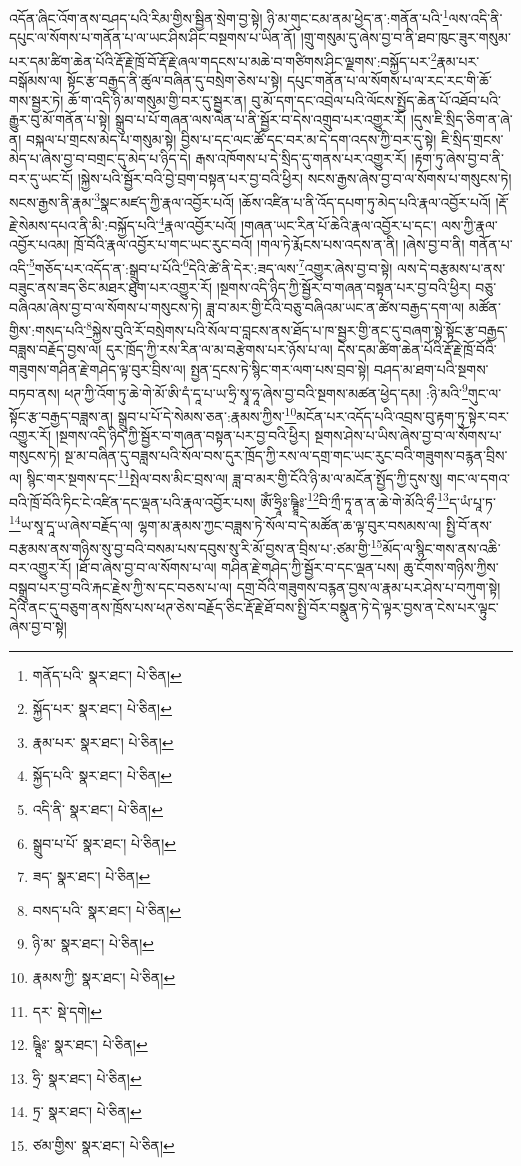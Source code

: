 འདོན་ཞིང་འོག་ནས་བཤད་པའི་རིམ་གྱིས་སྦྱིན་སྲེག་བྱ་སྟེ། ཉི་མ་གུང་ངམ་ནམ་ཕྱེད་ན་:གནོན་པའི་\footnote{གནོད་པའི་  སྣར་ཐང་།  པེ་ཅིན། }ལས་འདི་ནི་དཔུང་ལ་སོགས་པ་གནོན་པ་ལ་ཡང་ཤིས་ཤིང་བསྔགས་པ་ཡིན་ནོ། །གྲུ་གསུམ་དུ་ཞེས་བྱ་བ་ནི་ཐབ་ཁུང་ཟུར་གསུམ་པར་དམ་ཚིག་ཆེན་པོའི་རྡོ་རྗེ་ཁྲོ་བོ་རྡོ་རྗེ་ཞལ་གདངས་པ་མཆེ་བ་གཙིགས་ཤིང་ལྗགས་:བསྐྱོད་པར་\footnote{སྐྱོད་པར་  སྣར་ཐང་།  པེ་ཅིན། }རྣམ་པར་བསྒོམས་ལ། སྟོང་རྩ་བརྒྱད་ནི་ཚུལ་བཞིན་དུ་བསྲེག་ཅེས་པ་སྟེ། དཔུང་གནོན་པ་ལ་སོགས་པ་ལ་རང་རང་གི་ཆོ་གས་སྦྱར་ཏེ། ཆོ་ག་འདི་ཉི་མ་གསུམ་གྱི་བར་དུ་སྦྱར་ན། བུ་མོ་དག་དང་འབྲེལ་པའི་ལོངས་སྤྱོད་ཆེན་པོ་འཐོབ་པའི་རྒྱུར་བུ་མོ་གནོན་པ་སྟེ། སྒྲུབ་པ་པོ་གཞན་ལས་ལེན་པ་ནི་སྦྱོར་བ་དེས་འགྲུབ་པར་འགྱུར་རོ། །དུས་ཇི་སྲིད་ཅིག་ན་ཞེ་ན། བསྐལ་པ་གྲངས་མེད་པ་གསུམ་སྟེ། བྱིས་པ་དང་ལང་ཚོ་དང་བར་མ་དེ་དག་འདས་ཀྱི་བར་དུ་སྟེ། ཇི་སྲིད་གྲངས་མེད་པ་ཞེས་བྱ་བ་བགྲང་དུ་མེད་པ་ཉིད་དེ། རྒས་འཁོགས་པ་དེ་སྲིད་དུ་གནས་པར་འགྱུར་རོ། །རྟག་ཏུ་ཞེས་བྱ་བ་ནི་བར་དུ་ཡང་ངོ། །སྐྱེས་པའི་སྦྱོར་བའི་བྱེ་བྲག་བསྟན་པར་བྱ་བའི་ཕྱིར། སངས་རྒྱས་ཞེས་བྱ་བ་ལ་སོགས་པ་གསུངས་ཏེ། སངས་རྒྱས་ནི་རྣམ་\footnote{རྣམ་པར་  སྣར་ཐང་།  པེ་ཅིན། }སྣང་མཛད་ཀྱི་རྣལ་འབྱོར་པའོ། །ཆོས་འཛིན་པ་ནི་འོད་དཔག་ཏུ་མེད་པའི་རྣལ་འབྱོར་པའོ། །རྡོ་རྗེ་སེམས་དཔའ་ནི་མི་:བསྐྱོད་པའི་\footnote{སྐྱོད་པའི་  སྣར་ཐང་།  པེ་ཅིན། }རྣལ་འབྱོར་པའོ། །གཞན་ཡང་རིན་པོ་ཆེའི་རྣལ་འབྱོར་པ་དང་། ལས་ཀྱི་རྣལ་འབྱོར་པའམ། ཁྲོ་བོའི་རྣལ་འབྱོར་པ་གང་ཡང་རུང་བའོ། །གལ་ཏེ་རྨོངས་པས་འདས་ན་ནི། །ཞེས་བྱ་བ་ནི། གནོན་པ་འདི་\footnote{འདི་ནི་  སྣར་ཐང་།  པེ་ཅིན། }གཅོད་པར་འདོད་ན་:སྒྲུབ་པ་པོའི་\footnote{སྒྲུབ་པ་པོ་  སྣར་ཐང་།  པེ་ཅིན། }དེའི་ཚེ་ནི་དེར་:ཟད་ལས་\footnote{ཟད་  སྣར་ཐང་།  པེ་ཅིན། }འགྱུར་ཞེས་བྱ་བ་སྟེ། ལས་དེ་བརྩམས་པ་ནས་བཟུང་ནས་ཟད་ཅིང་མཐར་ཐུག་པར་འགྱུར་རོ། །སྔགས་འདི་ཉིད་ཀྱི་སྦྱོར་བ་གཞན་བསྟན་པར་བྱ་བའི་ཕྱིར། བཅུ་བཞིའམ་ཞེས་བྱ་བ་ལ་སོགས་པ་གསུངས་ཏེ། ཟླ་བ་མར་གྱི་ངོའི་བཅུ་བཞིའམ་ཡང་ན་ཚེས་བརྒྱད་དག་ལ། མཚོན་གྱིས་:གསད་པའི་\footnote{བསད་པའི་  སྣར་ཐང་།  པེ་ཅིན། }སྐྱེས་བུའི་རོ་བསྲེགས་པའི་སོལ་བ་བླངས་ནས་ཐོད་པ་ཁ་སྦྱར་གྱི་ནང་དུ་བཞག་སྟེ་སྟོང་རྩ་བརྒྱད་བཟླས་བརྗོད་བྱས་ལ། དུར་ཁྲོད་ཀྱི་རས་རིན་ལ་མ་བརྩེགས་པར་ཉོས་པ་ལ། དེས་དམ་ཚིག་ཆེན་པོའི་རྡོ་རྗེ་ཁྲོ་བོའི་གཟུགས་གཤིན་རྗེ་གཤེད་ལྟ་བུར་བྲིས་ལ། སྤྱན་དྲངས་ཏེ་སྙིང་གར་ལག་པས་བྲབ་སྟེ། བཤད་མ་ཐག་པའི་སྔགས་བཏབ་ནས། ཕཊ་ཀྱི་འོག་ཏུ་ཆེ་གེ་མོ་ཨི་དཾ་དཱ་པ་ཡ་ཧྲི་སྭཱ་ཧཱ་ཞེས་བྱ་བའི་སྔགས་མཚན་ཕྱེད་དམ། :ཉི་མའི་\footnote{ཉི་མ་  སྣར་ཐང་།  པེ་ཅིན། }གུང་ལ་སྟོང་རྩ་བརྒྱད་བཟླས་ན། སྒྲུབ་པ་པོ་དེ་སེམས་ཅན་:རྣམས་ཀྱིས་\footnote{རྣམས་ཀྱི་  སྣར་ཐང་།  པེ་ཅིན། }མངོན་པར་འདོད་པའི་འབྲས་བུ་རྟག་ཏུ་སྟེར་བར་འགྱུར་རོ། །སྔགས་འདི་ཉིད་ཀྱི་སྦྱོར་བ་གཞན་བསྟན་པར་བྱ་བའི་ཕྱིར། སྔགས་ཤེས་པ་ཡིས་ཞེས་བྱ་བ་ལ་སོགས་པ་གསུངས་ཏེ། སྔ་མ་བཞིན་དུ་བཟླས་པའི་སོལ་བས་དུར་ཁྲོད་ཀྱི་རས་ལ་དགྲ་གང་ཡང་རུང་བའི་གཟུགས་བརྙན་བྲིས་ལ། སྙིང་གར་སྔགས་དང་\footnote{དར་  སྡེ་དགེ། }སྤེལ་བས་མིང་བྲས་ལ། ཟླ་བ་མར་གྱི་ངོའི་ཉི་མ་ལ་མངོན་སྤྱོད་ཀྱི་དུས་སུ། གང་ལ་དགའ་བའི་ཁྲོ་བོའི་ཏིང་ངེ་འཛིན་དང་ལྡན་པའི་རྣལ་འབྱོར་པས། ཨོཾ་ཧྲཱིཿ་ཥྚྲཱིཿ་\footnote{ཥྚཱིཿ་  སྣར་ཐང་།  པེ་ཅིན། }བི་ཀྲྀ་ཏཱ་ན་ན་ཆེ་གེ་མོའི་ཧྲྀ་\footnote{ཧྲི་  སྣར་ཐང་།  པེ་ཅིན། }ད་ཡཾ་པཱ་ཏ་\footnote{ཏྲ་  སྣར་ཐང་།  པེ་ཅིན། }ཡ་སཱ་དཱ་ཡ་ཞེས་བརྗོད་ལ། ལྷག་མ་རྣམས་ཀྱང་བཟླས་ཏེ་སོལ་བ་དེ་མཚོན་ཆ་ལྟ་བུར་བསམས་ལ། སྤྱི་བོ་ནས་བརྩམས་ནས་གཉིས་སུ་བྱ་བའི་བསམ་པས་དབུས་སུ་རི་མོ་བྱས་ན་བྲིས་པ་:ཙམ་གྱི་\footnote{ཙམ་གྱིས་  སྣར་ཐང་།  པེ་ཅིན། }མོད་ལ་སྙིང་གས་ནས་འཆི་བར་འགྱུར་རོ། །ཐོ་བ་ཞེས་བྱ་བ་ལ་སོགས་པ་ལ། གཤིན་རྗེ་གཤེད་ཀྱི་སྦྱོར་བ་དང་ལྡན་པས། ཆུ་ངོགས་གཉིས་ཀྱིས་བསྒྲུབ་པར་བྱ་བའི་རྐང་རྗེས་ཀྱི་ས་དང་བཅས་པ་ལ། དགྲ་བོའི་གཟུགས་བརྙན་བྱས་ལ་རྣམ་པར་ཤེས་པ་བཀུག་སྟེ། དེའི་ནང་དུ་བཅུག་ནས་ཁྲོས་པས་ཕཊ་ཅེས་བརྗོད་ཅིང་རྡོ་རྗེ་ཐོ་བས་སྤྱི་བོར་བསྣུན་ཏེ་དེ་ལྟར་བྱས་ན་ངེས་པར་ལྟུང་ཞེས་བྱ་བ་སྟེ། 